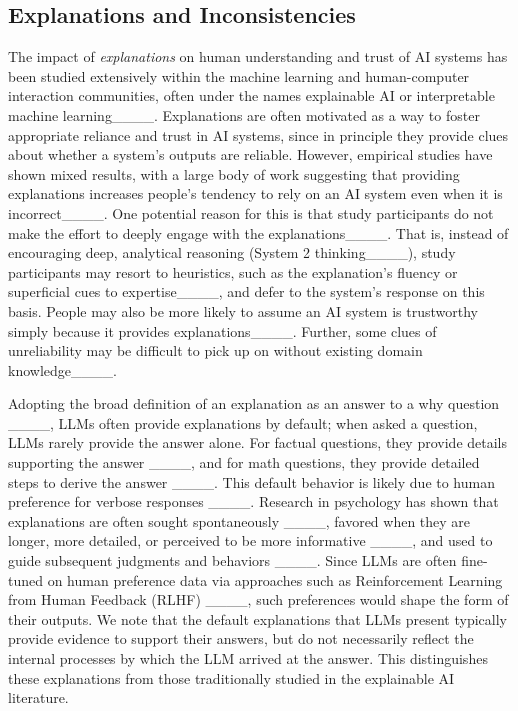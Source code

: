 \subsection{Explanations and Inconsistencies}
\label{sec:llmresponses}


The impact of \emph{explanations} on human understanding and trust of AI systems has been studied extensively within the machine learning and human-computer interaction communities, often under the names explainable AI or interpretable machine learning____. Explanations are often motivated as a way to foster appropriate reliance and trust in AI systems, since in principle they provide clues about whether a system's outputs are reliable. However, empirical studies have shown mixed results, with a large body of work suggesting that providing explanations increases people's tendency to rely on an AI system even when it is incorrect____. One potential reason for this is that study participants do not make the effort to deeply engage with the explanations____. That is, instead of encouraging deep, analytical reasoning (System 2 thinking____), study participants may resort to heuristics, such as the explanation's fluency or superficial cues to expertise____, and defer to the system's response on this basis. People may also be more likely to assume an AI system is trustworthy simply because it provides explanations____. Further, some clues of unreliability may be difficult to pick up on without existing domain knowledge____.


Adopting the broad definition of an explanation as an answer to a why question ____, LLMs often provide explanations by default; when asked a question, LLMs rarely provide the answer alone. For factual questions, they provide details supporting the answer ____, and for math questions, they provide detailed steps to derive the answer ____. 
This default behavior is likely due to human preference for verbose responses ____.
Research in psychology has shown that explanations are often sought spontaneously ____, favored when they are longer, more detailed, or perceived to be more informative ____, and used to guide subsequent judgments and behaviors ____. 
Since LLMs are often fine-tuned on human preference data via approaches such as Reinforcement Learning from Human Feedback (RLHF) ____, such preferences would shape the form of their outputs. We note that the default explanations that LLMs present typically provide evidence to support their answers, but do not necessarily reflect the internal processes by which the LLM arrived at the answer. This distinguishes these explanations from those traditionally studied in the explainable AI literature.


